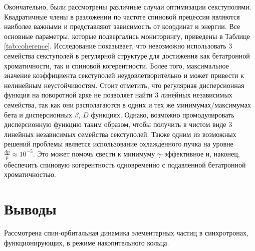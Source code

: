 \par Окончательно, были рассмотрены различные случаи оптимизации секступолями. Квадратичные члены в разложении по частоте спиновой прецессии являются наиболее важными и представляют зависимость от координат и энергии. Все основные параметры, которые подвергались мониторингу, приведены в Таблице \ref{tab:coherence}. Исследование показывает, что невозможно использовать 3 семейства секступолей в регулярной структуре для достижения как бетатронной хроматичности, так и спиновой когерентности. Более того, максимальное значение коэффициента секступолей неудовлетворительно и может привести к нелинейным неустойчивостям. Стоит отметить, что регулярная дисперсионная функция на поворотной арке не позволяет найти 3 линейных независимых семейства, так как они располагаются в одних и тех же минимумах/максимумах бета и дисперсионных $\beta$, $D$ функциях. Однако, возможно промодулировать дисперсионную функцию таким образом, чтобы получить в чистом виде 3 линейных независимых семейства секступолей. Также одним из возможных решений проблемы является использование охлажденного пучка на уровне $\frac{dp}{p}\approx{10}^{-5}$. Это может помочь свести к минимуму $\gamma$–эффективное и, наконец, обеспечить спиновую когерентность одновременно с подавленной бетатронной хроматичностью.

	\section*{Выводы}
\par Рассмотрена спин-орбитальная динамика элементарных частиц в синхротронах, функционирующих, в режиме накопительного кольца. 

